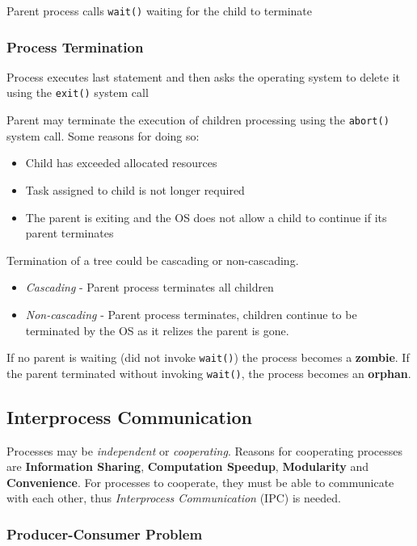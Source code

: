 \documentclass[]{article}
\begin{document}
Parent process calls \verb|wait()| waiting for the child to terminate

\subsubsection*{Process Termination}

Process executes last statement and then asks the operating system to delete it using the \verb|exit()| system call

Parent may terminate the execution of children processing using the \verb|abort()| system call. Some reasons for doing so:

\begin{itemize}
    \item Child has exceeded allocated resources
    \item Task assigned to child is not longer required
    \item The parent is exiting and the OS does not allow a child to continue if its parent terminates
\end{itemize}

Termination of a tree could be cascading or non-cascading.
\begin{itemize}
    \item \emph{Cascading} - Parent process terminates all children
    \item \emph{Non-cascading} - Parent process terminates, children continue to be terminated by the OS as it relizes the parent is gone.
\end{itemize}

If no parent is waiting (did not invoke \verb|wait()|) the process becomes a \textbf{zombie}. If the parent terminated without invoking \verb|wait()|, the process becomes an \textbf{orphan}.

\subsection{Interprocess Communication}

Processes may be \emph{independent} or \emph{cooperating}. Reasons for cooperating processes are \textbf{Information Sharing}, \textbf{Computation Speedup}, \textbf{Modularity} and \textbf{Convenience}. For processes to cooperate, they must be able to communicate with each other, thus \emph{Interprocess Communication} (IPC) is needed.

\subsubsection*{Producer-Consumer Problem}
\end{document}
